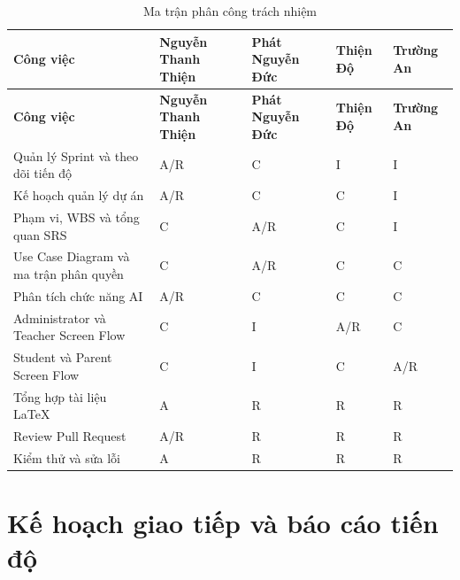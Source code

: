 \begin{longtable}{
		|p{4.7cm}
		|>{\centering\arraybackslash}p{2.1cm}
		|>{\centering\arraybackslash}p{2.1cm}
		|>{\centering\arraybackslash}p{2.1cm}
		|>{\centering\arraybackslash}p{2.1cm}|
	}
	\caption{Ma trận phân công trách nhiệm}
	\label{tab:raci}\\
	\hline
	\textbf{Công việc} &
	\textbf{Nguyễn Thanh Thiện} &
	\textbf{Phát Nguyễn Đức} &
	\textbf{Thiện Độ} &
	\textbf{Trường An} \\
	\hline
	\endfirsthead
	
	\hline
	\textbf{Công việc} &
	\textbf{Nguyễn Thanh Thiện} &
	\textbf{Phát Nguyễn Đức} &
	\textbf{Thiện Độ} &
	\textbf{Trường An} \\
	\hline
	\endhead
	
	Quản lý Sprint và theo dõi tiến độ &
	A/R & C & I & I \\
	\hline
	
	Kế hoạch quản lý dự án &
	A/R & C & C & I \\
	\hline
	
	Phạm vi, WBS và tổng quan SRS &
	C & A/R & C & I \\
	\hline
	
	Use Case Diagram và ma trận phân quyền &
	C & A/R & C & C \\
	\hline
	
	Phân tích chức năng AI &
	A/R & C & C & C \\
	\hline
	
	Administrator và Teacher Screen Flow &
	C & I & A/R & C \\
	\hline
	
	Student và Parent Screen Flow &
	C & I & C & A/R \\
	\hline
	
	Tổng hợp tài liệu LaTeX &
	A & R & R & R \\
	\hline
	
	Review Pull Request &
	A/R & R & R & R \\
	\hline
	
	Kiểm thử và sửa lỗi &
	A & R & R & R \\
	\hline
	
\end{longtable}

\section{Kế hoạch giao tiếp và báo cáo tiến độ}

